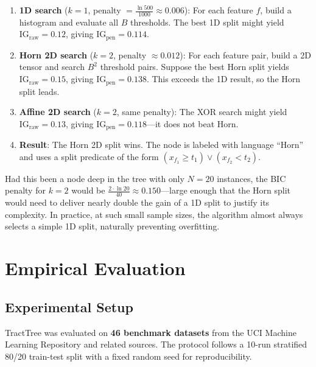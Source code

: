 \documentclass[11pt,a4paper]{article}
\begin{document}
\begin{enumerate}[leftmargin=2em]
    \item \textbf{1D search} ($k=1$, penalty $= \frac{\ln 500}{1000} \approx 0.006$): For each feature $f$, build a histogram and evaluate all $B$ thresholds. The best 1D split might yield $\mathrm{IG}_{\mathrm{raw}} = 0.12$, giving $\mathrm{IG}_{\mathrm{pen}} = 0.114$.

    \item \textbf{Horn 2D search} ($k=2$, penalty $\approx 0.012$): For each feature pair, build a 2D tensor and search $B^2$ threshold pairs. Suppose the best Horn split yields $\mathrm{IG}_{\mathrm{raw}} = 0.15$, giving $\mathrm{IG}_{\mathrm{pen}} = 0.138$. This exceeds the 1D result, so the Horn split leads.

    \item \textbf{Affine 2D search} ($k=2$, same penalty): The XOR search might yield $\mathrm{IG}_{\mathrm{raw}} = 0.13$, giving $\mathrm{IG}_{\mathrm{pen}} = 0.118$---it does not beat Horn.

    \item \textbf{Result}: The Horn 2D split wins. The node is labeled with language ``Horn'' and uses a split predicate of the form $(x_{f_1} \geq t_1) \vee (x_{f_2} < t_2)$.
\end{enumerate}

Had this been a node deep in the tree with only $N = 20$ instances, the BIC penalty for $k = 2$ would be $\frac{2 \cdot \ln 20}{40} \approx 0.150$---large enough that the Horn split would need to deliver nearly double the gain of a 1D split to justify its complexity. In practice, at such small sample sizes, the algorithm almost always selects a simple 1D split, naturally preventing overfitting.


\section{Empirical Evaluation}
\label{sec:experiments}

\subsection{Experimental Setup}

TractTree was evaluated on \textbf{46 benchmark datasets} from the UCI Machine Learning Repository and related sources. The protocol follows a 10-run stratified 80/20 train-test split with a fixed random seed for reproducibility.
\end{document}
